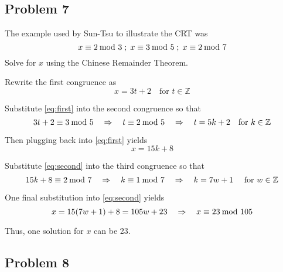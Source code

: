 \documentclass[../hw_sols.tex]{subfiles}
\begin{document}

\subsection*{Problem 7}

The example used by Sun-Tsu to illustrate the CRT was
	\[ x \equiv 2 \tmod{3} \; 
	; \; x \equiv 3 \tmod{5} \; 
	; \; x \equiv 2 \tmod{7} \]
Solve for $x$ using the Chinese Remainder Theorem.

\begin{solution}

Rewrite the first congruence as
\begin{equation}
	x = 3t + 2 \quad \text{for } t \in \mathbb{Z}
	\label{eq:first}
\end{equation}

Substitute \eqref{eq:first} into the second congruence so that 
	\[ 3t + 2 \equiv 3 \tmod{5} 
	\quad \Rightarrow \quad 
	t \equiv 2 \tmod{5} 
	\quad \Rightarrow \quad 
	t = 5k + 2 \quad \text{for } k \in \mathbb{Z} \]

Then plugging back into \eqref{eq:first} yields 
\begin{equation}
	x = 15k + 8
	\label{eq:second}
\end{equation}

Substitute \eqref{eq:second} into the third congruence so that
	\[ 15k + 8 \equiv 2 \tmod{7} 
	\quad \Rightarrow \quad 
	k \equiv 1 \tmod{7} 
	\quad \Rightarrow \quad 
	k = 7w + 1 \quad \text{ for } w \in \mathbb{Z} \]

One final substitution into \eqref{eq:second} yields
	\[ x = 15(7w + 1) + 8 = 105w + 23 
	\quad \Rightarrow \quad 
	x \equiv 23 \tmod{105} \]

Thus, one solution for $x$ can be 23.

\end{solution}


\newpage



\subsection*{Problem 8}
\label{prob8}
\end{document}
